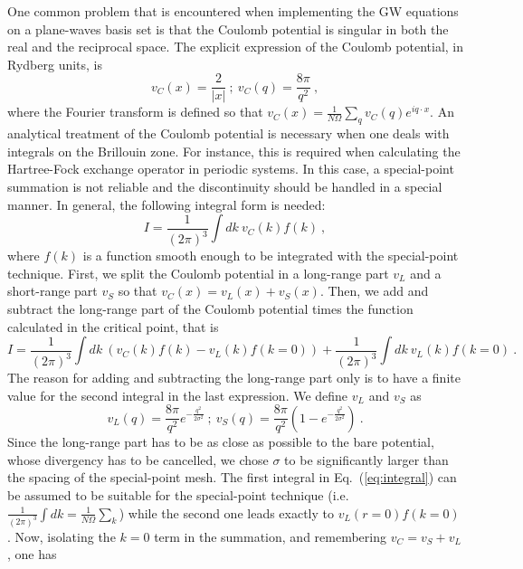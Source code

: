 \documentclass[11pt]{article}
\begin{document}
One common problem that is encountered when implementing the
GW equations on a plane-waves basis set is that the Coulomb
potential is singular in both the real and the reciprocal space.
The explicit expression of the Coulomb potential, in Rydberg units, is
\begin{equation}
v_C(x) = \frac{2}{|x|} ~ ; ~ v_C(q) = \frac{8\pi}{q^2} ~,
\end{equation}
where the Fourier transform is defined so that
$v_C(x) = \frac{1}{N\Omega}\sum_{q} v_C(q) e^{iq\cdot x}$.
An analytical treatment of the Coulomb potential is necessary
when one deals with integrals on the Brillouin zone.
For instance, this is required when calculating the Hartree-Fock exchange operator
in periodic systems.
In this case, a special-point summation is not reliable and
the discontinuity should be handled in a special manner.
In general, the following integral form is needed:
\begin{equation}
I=\frac{1}{(2\pi)^3}\int dk ~ v_C(k) f(k) ~ ,
\end{equation}
where $f(k)$ is a function smooth enough to
be integrated with the special-point technique.
First, we split the Coulomb potential
in a long-range part $v_L$ and a short-range part $v_S$
so that $v_C(x) = v_L(x) + v_S(x)$.
Then, we add and subtract the long-range part of the
Coulomb potential times the function calculated in the critical point, that is
\begin{equation} \label{eq:integral}
I = \frac{1}{(2\pi)^3}\int dk ~ (v_C(k)f(k)-v_L(k)f(k=0))
  + \frac{1}{(2\pi)^3}\int dk ~ v_L(k) f(k=0)~.
\end{equation}
The reason for adding and subtracting the long-range part only is to have a finite
value for the second integral in the last expression.
We define $v_L$ and $v_S$ as
\begin{equation}
v_L(q) = \frac{8\pi}{q^2} e^{-\frac{q^2}{2\sigma^2}} ~ ; ~
v_S(q) = \frac{8\pi}{q^2} \left( 1 - e^{-\frac{q^2}{2\sigma^2}} \right)~.
\end{equation}
Since the long-range part has to be as close as possible to the
bare potential, whose divergency has to be cancelled, we chose
$\sigma$ to be significantly larger than the spacing of the special-point mesh.
The first integral in Eq.~(\ref{eq:integral}) can be assumed to be suitable for the special-point
technique (i.e. $\frac{1}{(2\pi)^3}\int dk = \frac{1}{N\Omega}\sum_{k}$)
while the second one leads exactly to $v_L(r=0)f(k=0)$. Now,
isolating the $k=0$ term in the summation, and remembering
$v_C = v_S + v_L$, one has
\end{document}
